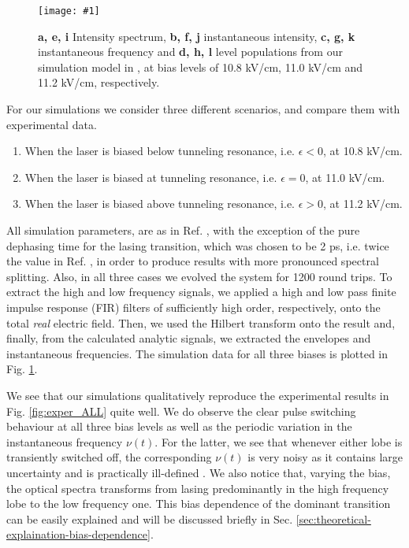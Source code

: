 \documentclass[]{spie}  %
\newcommand{\includegraphicsXL}[1]{\texttt{[image: \#1]}}
\begin{document}
\begin{figure}[h!]
	\begin{center}
		\includegraphicsXL{IMGS/sim_ALL.eps}
		\caption{ \textbf{a, e, i} Intensity spectrum, \textbf{b, f, j} instantaneous intensity, \textbf{c, g, k} instantaneous frequency and \textbf{d, h, l} level populations from our simulation model in , at bias levels of 10.8 kV/cm, 11.0 kV/cm and 11.2 kV/cm, respectively.} \label{fig:sim_ALL}
	\end{center}	
\end{figure}
For our simulations we consider three different scenarios, and compare them with experimental data.  
\begin{enumerate}
	\item When the laser is biased below tunneling resonance, i.e. $\epsilon < 0$, at 10.8 kV/cm.
	\item When the laser is biased at tunneling resonance, i.e. $\epsilon = 0$, at 11.0 kV/cm.
	\item When the laser is biased above tunneling resonance, i.e. $\epsilon > 0$, at 11.2 kV/cm. 
\end{enumerate}
All simulation parameters, are as in Ref. , with the exception of the pure dephasing time for the lasing transition, which was chosen to be 2 ps, i.e. twice the value in Ref. , in order to produce results with more pronounced spectral splitting. Also, in all three cases we evolved the system for 1200 round trips. To extract the high and low frequency signals, we applied a high and low pass finite impulse response (FIR) filters of sufficiently high order, respectively, onto the total \emph{real} electric field. Then, we used the Hilbert transform onto the result and, finally, from the calculated analytic signals, we extracted the envelopes and instantaneous frequencies. The simulation data for all three biases is plotted in Fig. \ref{fig:sim_ALL}.


We see that our simulations qualitatively reproduce the experimental results in Fig. \ref{fig:exper_ALL} quite well. We do observe the clear pulse switching behaviour at all three bias levels as well as the periodic variation in the instantaneous frequency $\nu(t)$. For the latter, we see that whenever either lobe is transiently switched off, the corresponding $\nu(t)$ is very noisy as it contains large uncertainty and is practically ill-defined \cite{burghoff2014broadband}. We also notice that, varying the bias, the optical spectra transforms from lasing predominantly in the high frequency lobe to the low frequency one. This bias dependence of the dominant transition can be easily explained and will be discussed briefly in Sec. \ref{sec:theoretical-explaination-bias-dependence}.
\end{document}

